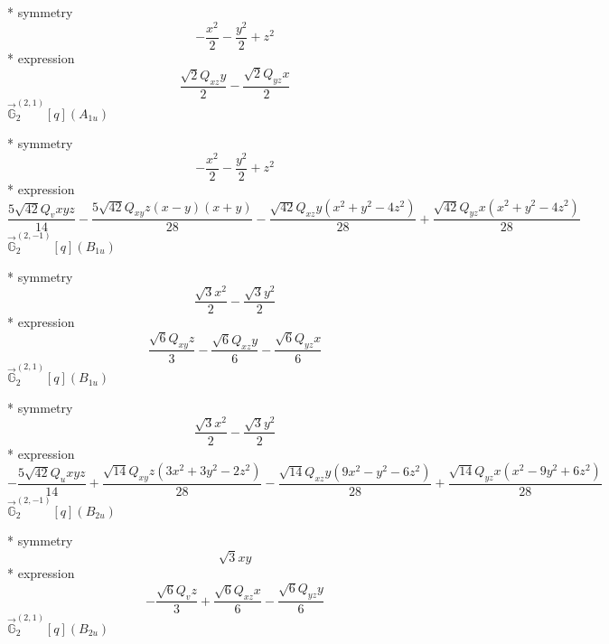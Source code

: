 \documentclass[fleqn,8pt]{jsarticle}
\begin{document}
\noindent\quad ** symmetry
\begin{dmath*}
- \frac{x^{2}}{2} - \frac{y^{2}}{2} + z^{2}
\end{dmath*}
\noindent\quad ** expression
\begin{dmath*}
\frac{\sqrt{2} Q_{xz} y}{2} - \frac{\sqrt{2} Q_{yz} x}{2}
\end{dmath*}
\noindent\quad $\vec{\mathbb{G}}_{2}^{(2,1)}[q](A_{1u})$

\noindent\quad ** symmetry
\begin{dmath*}
- \frac{x^{2}}{2} - \frac{y^{2}}{2} + z^{2}
\end{dmath*}
\noindent\quad ** expression
\begin{dmath*}
\frac{5 \sqrt{42} Q_{v} x y z}{14} - \frac{5 \sqrt{42} Q_{xy} z \left(x - y\right) \left(x + y\right)}{28} - \frac{\sqrt{42} Q_{xz} y \left(x^{2} + y^{2} - 4 z^{2}\right)}{28} + \frac{\sqrt{42} Q_{yz} x \left(x^{2} + y^{2} - 4 z^{2}\right)}{28}
\end{dmath*}
\noindent\quad $\vec{\mathbb{G}}_{2}^{(2,-1)}[q](B_{1u})$

\noindent\quad ** symmetry
\begin{dmath*}
\frac{\sqrt{3} x^{2}}{2} - \frac{\sqrt{3} y^{2}}{2}
\end{dmath*}
\noindent\quad ** expression
\begin{dmath*}
\frac{\sqrt{6} Q_{xy} z}{3} - \frac{\sqrt{6} Q_{xz} y}{6} - \frac{\sqrt{6} Q_{yz} x}{6}
\end{dmath*}
\noindent\quad $\vec{\mathbb{G}}_{2}^{(2,1)}[q](B_{1u})$

\noindent\quad ** symmetry
\begin{dmath*}
\frac{\sqrt{3} x^{2}}{2} - \frac{\sqrt{3} y^{2}}{2}
\end{dmath*}
\noindent\quad ** expression
\begin{dmath*}
- \frac{5 \sqrt{42} Q_{u} x y z}{14} + \frac{\sqrt{14} Q_{xy} z \left(3 x^{2} + 3 y^{2} - 2 z^{2}\right)}{28} - \frac{\sqrt{14} Q_{xz} y \left(9 x^{2} - y^{2} - 6 z^{2}\right)}{28} + \frac{\sqrt{14} Q_{yz} x \left(x^{2} - 9 y^{2} + 6 z^{2}\right)}{28}
\end{dmath*}
\noindent\quad $\vec{\mathbb{G}}_{2}^{(2,-1)}[q](B_{2u})$

\noindent\quad ** symmetry
\begin{dmath*}
\sqrt{3} x y
\end{dmath*}
\noindent\quad ** expression
\begin{dmath*}
- \frac{\sqrt{6} Q_{v} z}{3} + \frac{\sqrt{6} Q_{xz} x}{6} - \frac{\sqrt{6} Q_{yz} y}{6}
\end{dmath*}
\noindent\quad $\vec{\mathbb{G}}_{2}^{(2,1)}[q](B_{2u})$
\end{document}
